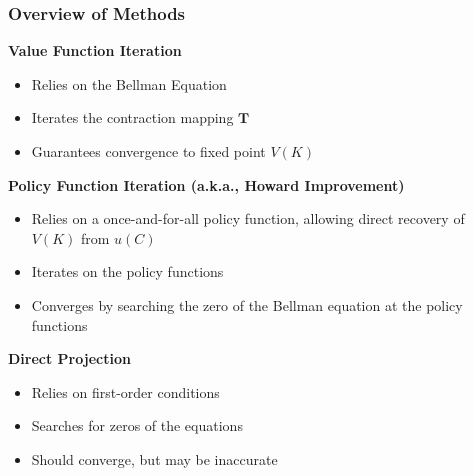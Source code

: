 \documentclass[10pt, aspectratio=1610, handout]{beamer}
\begin{document}
  \begin{frame}
    \frametitle{Overview of Methods}

    \textbf{Value Function Iteration}
    \begin{itemize}
      \item Relies on the Bellman Equation
      \item Iterates the contraction mapping $\mathbf{T}$
      \item Guarantees convergence to fixed point $V(K)$
    \end{itemize}

    \vfill\pause

    \textbf{Policy Function Iteration (a.k.a., Howard Improvement)}
    \begin{itemize}
      \item Relies on a once-and-for-all policy function, allowing direct recovery of $V(K)$ from $u(C)$
      \item Iterates on the policy functions
      \item Converges by searching the zero of the Bellman equation at the policy functions
    \end{itemize}

    \vfill\pause

    \textbf{Direct Projection}
    \begin{itemize}
      \item Relies on first-order conditions
      \item Searches for zeros of the equations
      \item Should converge, but may be inaccurate
    \end{itemize}

  \end{frame}
\end{document}
